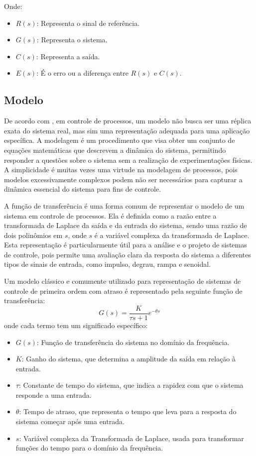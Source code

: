 Onde:
\begin{itemize}
    \item $R(s)$: Representa o sinal de referência.
    \item $G(s)$: Representa o sistema.
    \item $C(s)$: Representa a saída.
    \item $E(s)$: É o erro ou a diferença entre $R(s)$ e $C(s)$.
\end{itemize}

\subsection{Modelo}\label{subsec:modelfund}

De acordo com \cite{CoelhoIdentificacao}, em controle de processos, um modelo não busca ser uma réplica exata do
sistema real, mas sim uma representação adequada para uma aplicação específica.
A modelagem é um procedimento que visa obter um conjunto de equações matemáticas que descrevem a dinâmica do sistema,
permitindo responder a questões sobre o sistema sem a realização de experimentações físicas.
A simplicidade é muitas vezes uma virtude na modelagem de processos, pois modelos excessivamente complexos podem
não ser necessários para capturar a dinâmica essencial do sistema para fins de controle.

A função de transferência é uma forma comum de representar o modelo de um sistema em controle de processos.
Ela é definida como a razão entre a transformada de Laplace da saída e da entrada do sistema,
sendo uma razão de dois polinômios em $s$, onde $s$ é a variável complexa da transformada de Laplace.
Esta representação é particularmente útil para a análise e o projeto de sistemas de controle,
pois permite uma avaliação clara da resposta do sistema a diferentes tipos de sinais de entrada,
como impulso, degrau, rampa e senoidal.

Um modelo clássico e comumente utilizado para representação de sistemas de controle de primeira ordem com atraso é
representado pela seguinte função de transferência:
\begin{equation}
    \label{eq:firstordertf}
    G(s) = \frac{K}{\tau s + 1}e^{-\theta s}
\end{equation}
onde cada termo tem um significado específico:
\begin{itemize}
    \item $G(s)$: Função de transferência do sistema no domínio da frequência.
    \item $K$: Ganho do sistema, que determina a amplitude da saída em relação à entrada.
    \item $\tau$: Constante de tempo do sistema, que indica a rapidez com que o sistema responde a uma entrada.
    \item $\theta$: Tempo de atraso, que representa o tempo que leva para a resposta do sistema começar após uma entrada.
    \item $s$: Variável complexa da Transformada de Laplace, usada para transformar funções do tempo para o domínio da frequência.
\end{itemize}


